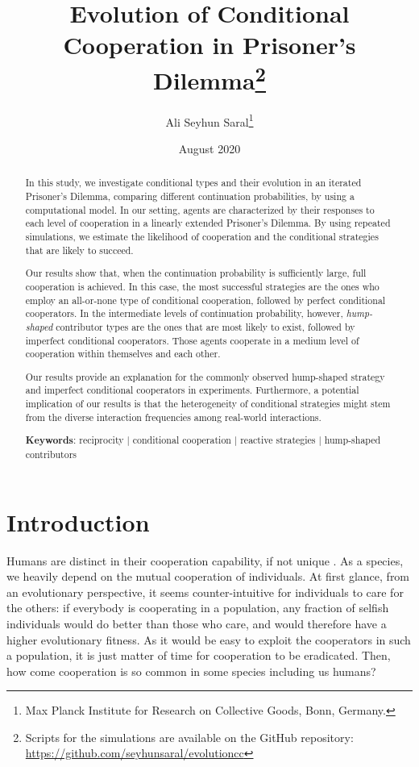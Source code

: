 \documentclass[12pt]{article}
\title{Evolution of Conditional Cooperation in Prisoner's Dilemma\footnote{Scripts for the simulations are available on the GitHub repository: \url{https://github.com/seyhunsaral/evolutioncc}}}
\author{Ali Seyhun Saral\thanks{Max Planck Institute for Research on Collective Goods, Bonn, Germany.}}
\date{August 2020}
\begin{document}
\onehalfspacing
\sloppy
\maketitle        
\begin{abstract}

\thispagestyle{plain}

In this study, we investigate conditional types and their evolution in an iterated Prisoner's Dilemma, comparing different continuation probabilities, by using a computational model. In our setting, agents are characterized by their responses to each level of cooperation in a linearly extended Prisoner's Dilemma. By using repeated simulations, we estimate the likelihood of cooperation and the conditional strategies that are likely to succeed. 

Our results show that, when the continuation probability is sufficiently large, full cooperation is achieved. In this case, the most successful strategies are the ones who employ an all-or-none type of conditional cooperation, followed by perfect conditional cooperators. In the intermediate levels of continuation probability, however, \textit{hump-shaped} contributor types are the ones that are most likely to exist, followed by imperfect conditional cooperators. Those agents cooperate in a medium level of cooperation within themselves and each other. 

Our results provide an explanation for the commonly observed hump-shaped strategy and imperfect conditional cooperators in experiments. Furthermore, a potential implication of our results is that the heterogeneity of conditional strategies might stem from the diverse interaction frequencies among real-world interactions. 

\textbf{Keywords}: reciprocity | conditional cooperation | reactive strategies | hump-shaped contributors 
\end{abstract}

\section{Introduction} 
Humans are distinct in their cooperation capability, if not unique \citep[See][]{Bowles2011,Wilson2012}. As a species, we heavily depend on the mutual cooperation of individuals. At first glance, from an evolutionary perspective, it seems counter-intuitive for  individuals to care for the others: if everybody is cooperating in a population, any fraction of selfish individuals would do better than those who care, and would therefore have a higher evolutionary fitness. As it would be easy to exploit the cooperators in such a population, it is just matter of time for cooperation to be eradicated. Then, how come cooperation is so common in some species including us humans?
\end{document}
